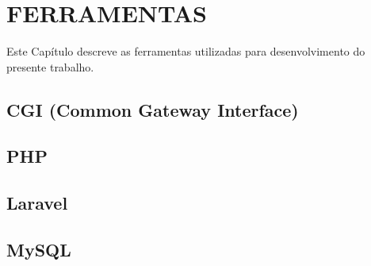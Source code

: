 
\chapter{FERRAMENTAS}
Este Capítulo descreve as ferramentas utilizadas para desenvolvimento do presente trabalho.

\section{CGI (Common Gateway Interface)}


\section{PHP}


\newpage
\section{Laravel}


\section{MySQL}


%
